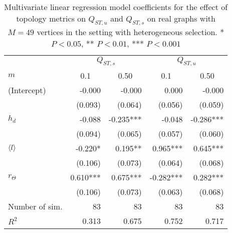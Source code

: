 \begin{table}
  \caption{Multivariate linear regression model coefficients for the effect of topology metrics on $Q_{ST,u}$ and $Q_{ST,s}$ on real graphs with $M=49$ vertices in the setting with heterogeneous selection. * $P < 0.05$,  ** $P < 0.01$, *** $P < 0.001$}
  \centering
    \begin{tabular}{lrrrr}
    \toprule
    &       \multicolumn{2}{c}{$Q_{ST,s}$}                           &               \multicolumn{2}{c}{$Q_{ST,u}$}        \\ 
    \cmidrule(lr){2-3} \cmidrule(lr){4-5} 
$m$            & \multicolumn{1}{c}{0.1} & \multicolumn{1}{c}{0.50} & \multicolumn{1}{c}{0.1} & \multicolumn{1}{c}{0.50} \\ 
    \hline
(Intercept) &                  -0.000 &                   -0.000 &                    0.000 &                   -0.000 \\ 
            &                 (0.093) &                  (0.064) &                  (0.056) &                  (0.059) \\ 
$h_d$       &                  -0.088 &                -0.235*** &                   -0.048 &                -0.286*** \\ 
            &                 (0.094) &                  (0.065) &                  (0.057) &                  (0.060) \\ 
$\langle l \rangle$        &                 -0.220* &                  0.195** &                 0.965*** &                 0.645*** \\ 
            &                 (0.106) &                  (0.073) &                  (0.064) &                  (0.068) \\ 
$r_\Theta$  &                0.610*** &                 0.675*** &                -0.282*** &                 0.282*** \\ 
            &                 (0.106) &                  (0.073) &                  (0.063) &                  (0.068) \\ 
\midrule
Number of sim.&                    83 &                       83 &                       83 &                       83 \\ 
$R^2$       &                   0.313 &                    0.675 &                    0.752 &                    0.717 \\ 
    \bottomrule
  \end{tabular}
\label{tableSI:coefficients_realgraphs}
\end{table}
\FloatBarrier


